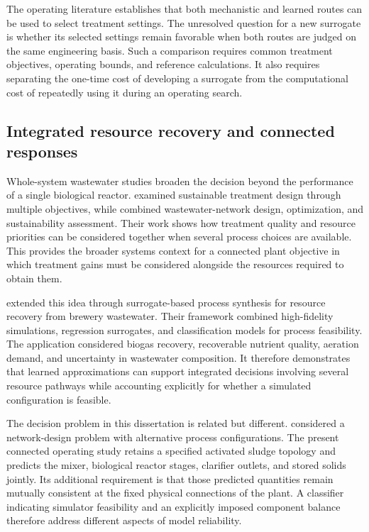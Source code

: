 The operating literature establishes that both mechanistic and learned routes can be used to select treatment settings. The unresolved question for a new surrogate is whether its selected settings remain favorable when both routes are judged on the same engineering basis. Such a comparison requires common treatment objectives, operating bounds, and reference calculations. It also requires separating the one-time cost of developing a surrogate from the computational cost of repeatedly using it during an operating search.

\subsection{Integrated resource recovery and connected responses}

Whole-system wastewater studies broaden the decision beyond the performance of a single biological reactor. \citet{PadronPaez2020} examined sustainable treatment design through multiple objectives, while \citet{Aboagye2021} combined wastewater-network design, optimization, and sustainability assessment. Their work shows how treatment quality and resource priorities can be considered together when several process choices are available. This provides the broader systems context for a connected plant objective in which treatment gains must be considered alongside the resources required to obtain them.

\citet{Durkin2024} extended this idea through surrogate-based process synthesis for resource recovery from brewery wastewater. Their framework combined high-fidelity simulations, regression surrogates, and classification models for process feasibility. The application considered biogas recovery, recoverable nutrient quality, aeration demand, and uncertainty in wastewater composition. It therefore demonstrates that learned approximations can support integrated decisions involving several resource pathways while accounting explicitly for whether a simulated configuration is feasible.

The decision problem in this dissertation is related but different. \citet{Durkin2024} considered a network-design problem with alternative process configurations. The present connected operating study retains a specified activated sludge topology and predicts the mixer, biological reactor stages, clarifier outlets, and stored solids jointly. Its additional requirement is that those predicted quantities remain mutually consistent at the fixed physical connections of the plant. A classifier indicating simulator feasibility and an explicitly imposed component balance therefore address different aspects of model reliability.

